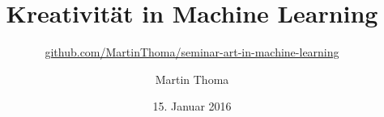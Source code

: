 \documentclass[hyperref={pdfpagelabels=false},usepdftitle=false]{beamer}
\newcommand\titleText{Kreativität in Machine Learning}
\begin{document}
\title{\titleText}
\subtitle{\href{https://github.com/MartinThoma/seminar-art-in-machine-learning}{github.com/MartinThoma/seminar-art-in-machine-learning}}
\author{Martin Thoma}
\date{15. Januar 2016}
\subject{Machine Learning}

\frame{\titlepage}


\end{document}

